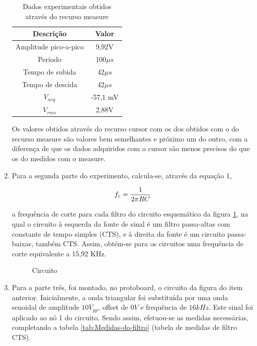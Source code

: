 \documentclass[a4paper]{article} %
\begin{document}
\begin{enumerate}
\begin{table}[h]
\begin{centering}
\caption{Dados experimentais obtidos através do recurso measure \label{tab:measure}}
\begin{tabular}{cc}
\hline 
Descrição & Valor\tabularnewline
\hline
Amplitude pico-a-pico & 9,92V \tabularnewline
Período & 100$\mu s$\tabularnewline
Tempo de subida & 42$\mu s$\tabularnewline
Tempo de descida  & 42$\mu s$\tabularnewline
$V_{avg}$ & -57,1 mV\tabularnewline
$V_{rms}$ & 2,88V \tabularnewline
\hline
\end{tabular}
\par\end{centering}
\end{table}
\newpage
Os valores obtidos através do recurso cursor com os dos obtidos com o do recurso measure são valores bem semelhantes e próximo um do outro, com a diferença de que os dados adquiridos com o cursor são menos precisos do que os do medidos com o measure.

\item Para a segunda parte do experimento, calcula-se, através da equação 1,
\vspace{1mm}

\begin{equation}
 f_{c}=\frac{1}{2\pi RC}\\
\end{equation}

\vspace{2mm}


 a frequência de corte para cada filtro do circuito esquemático da figura \ref{tab:circ}, na qual o circuito à esquerda da fonte de sinal é um filtro passa-altas com constante de tempo simples (CTS), e à direita da fonte é um circuito passa-baixas, também CTS. Assim, obtém-se para os circuitos uma frequência de corte equivalente a 15,92 KHz.


\vspace{3mm}
\begin{figure}[h]
\centerline{}
\caption{Circuito \label{tab:circ}}
\end{figure}

\vspace{2mm}


\item Para a parte três, foi montado, no protoboard, o circuito da figura do item anterior. Inicialmente, a onda triangular foi substituída por uma onda senoidal de amplitude $10V_{pp}$, offset de $0V$ e frequência de $16kHz$. Este sinal foi aplicado ao nó 1 do circuito. Sendo assim, efetuou-se as medidas necessárias, completando a tabela \ref{tab:Medidas-do-filtro} (tabela de medidas de filtro CTS).


\end{enumerate}
\end{document}
